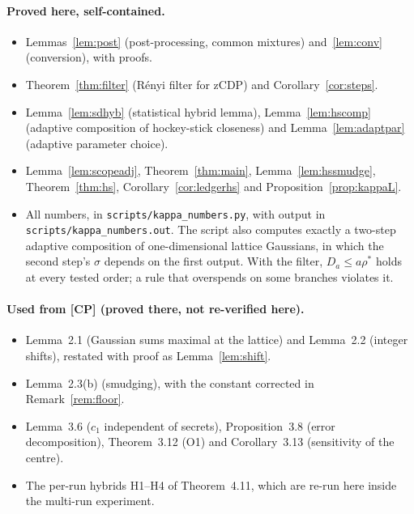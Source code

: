 \documentclass[11pt]{article}
\theoremstyle{definition}
\theoremstyle{plain}
\newcommand{\CP}{\textup{[CP]}}
\begin{document}
\paragraph{Proved here, self-contained.}
\begin{itemize}[nosep]
  \item Lemmas~\ref{lem:post} (post-processing, common mixtures) and~\ref{lem:conv} (conversion), with proofs.
  \item Theorem~\ref{thm:filter} (R\'enyi filter for zCDP) and Corollary~\ref{cor:steps}.
  \item Lemma~\ref{lem:sdhyb} (statistical hybrid lemma), Lemma~\ref{lem:hscomp} (adaptive composition of hockey-stick closeness) and Lemma~\ref{lem:adaptpar} (adaptive parameter choice).
  \item Lemma~\ref{lem:scopeadj}, Theorem~\ref{thm:main}, Lemma~\ref{lem:hssmudge}, Theorem~\ref{thm:hs}, Corollary~\ref{cor:ledgerhs} and Proposition~\ref{prop:kappaL}.
  \item All numbers, in \texttt{scripts/kappa\_numbers.py}, with output in \texttt{scripts/kappa\_numbers.out}. The script also computes exactly a two-step adaptive composition of one-dimensional lattice Gaussians, in which the second step's $\sigma$ depends on the first output. With the filter, $D_a\le a\rho^*$ holds at every tested order; a rule that overspends on some branches violates it.
\end{itemize}

\paragraph{Used from \CP{} (proved there, not re-verified here).}
\begin{itemize}[nosep]
  \item Lemma~2.1 (Gaussian sums maximal at the lattice) and Lemma~2.2 (integer shifts), restated with proof as Lemma~\ref{lem:shift}.
  \item Lemma~2.3(b) (smudging), with the constant corrected in Remark~\ref{rem:floor}.
  \item Lemma~3.6 ($c_1$ independent of secrets), Proposition~3.8 (error decomposition), Theorem~3.12 (O1) and Corollary~3.13 (sensitivity of the centre).
  \item The per-run hybrids H1--H4 of Theorem~4.11, which are re-run here inside the multi-run experiment.
\end{itemize}
\end{document}
